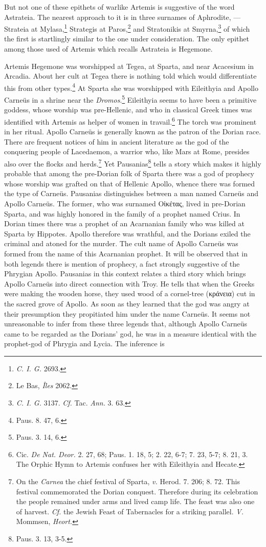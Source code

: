 \documentclass[a4paper, 12pt, oneside]{article}
\begin{document}
But not one of these epithets of warlike Artemis is suggestive of the word Astrateia. The nearest approach to it is in three surnames of Aphrodite, --- Strateia at Mylasa,\footnote{\emph{C. I. G.} 2693.} Strategis at Paros,\footnote{Le Bas, \emph{Îles} 2062.} and Stratonikis at Smyrna,\footnote{\emph{C. I. G.} 3137. \emph{Cf.} Tac. \emph{Ann.} 3. 63.} of which the first is startlingly similar to the one under consideration. The only epithet among those used of Artemis which recalls Astrateia is Hegemone.

Artemis Hegemone was worshipped at Tegea, at Sparta, and near Acacesium in Arcadia. About her cult at Tegea there is nothing told which would differentiate this from other types.\footnote{Paus. 8. 47, 6.} At Sparta she was worshipped with Eileithyia and Apollo Carneüs in a shrine near the \emph{Dromos}.\footnote{Paus. 3. 14, 6.} Eileithyia seems to have been a primitive goddess, whose worship was pre-Hellenic, and who in classical Greek times was identified with Artemis as helper of women in travail.\footnote{Cic. \emph{De Nat. Deor.} 2. 27, 68; Paus. 1. 18, 5; 2. 22, 6-7; 7. 23, 5-7; 8. 21, 3. The Orphic Hymn to Artemis confuses her with Eileithyia and Hecate.} The torch was prominent in her ritual. Apollo Carneüs is generally known as the patron of the Dorian race. There are frequent notices of him in ancient literature as the god of the conquering people of Lacedaemon, a warrior who, like Mars at Rome, presides also over the flocks and herds.\footnote{On the \emph{Carnea} the chief festival of Sparta, \emph{v.} Herod. 7. 206; 8. 72. This festival commemorated the Dorian conquest. Therefore during its celebration the people remained under arms and lived camp life. The feast was also one of harvest. \emph{Cf.} the Jewish Feast of Tabernacles for a striking parallel. \emph{V.} Mommsen, \emph{Heort.}} Yet Pausanias\footnote{Paus. 3. 13, 3-5.} tells a story which makes it highly probable that among the pre-Dorian folk of Sparta there was a god of prophecy whose worship was grafted on that of Hellenic Apollo, whence there was formed the type of Carneüs. Pausanias distinguishes between a man named Carneüs and Apollo Carneüs. The former, who was surnamed Οἰκέτας, lived in pre-Dorian Sparta, and was highly honored in the family of a prophet named Crius. In Dorian times there was a prophet of an Acarnanian family who was killed at Sparta by Hippotes. Apollo therefore was wrathful, and the Dorians exiled the criminal and atoned for the murder. The cult name of Apollo Carneüs was formed from the name of this Acarnanian prophet. It will be observed that in both legends there is mention of prophecy, a fact strongly suggestive of the Phrygian Apollo. Pausanias in this context relates a third story which brings Apollo Carneüs into direct connection with Troy. He tells that when the Greeks were making the wooden horse, they used wood of a cornel-tree (κράνεια) cut in the sacred grove of Apollo. As soon as they learned that the god was angry at their presumption they propitiated him under the name Carneüs. It seems not unreasonable to infer from these three legends that, although Apollo Carneüs came to be regarded as the Dorians' god, he was in a measure identical with the prophet-god of Phrygia and Lycia. The inference is 
\end{document}
